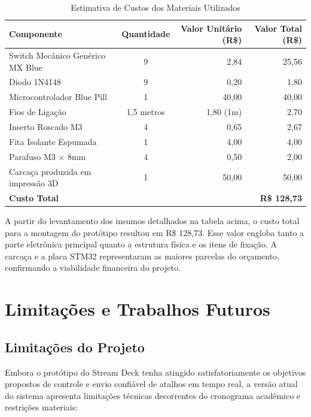 \documentclass[12pt, a4paper]{article}
\begin{document}
\begin{table}[H]
\centering
\caption{Estimativa de Custos dos Materiais Utilizados}
\label{tab:custos}
\begin{tabular}{@{}lcrr@{}}
\toprule
\textbf{Componente} & \textbf{Quantidade} & \textbf{Valor Unitário (R\$)} & \textbf{Valor Total (R\$)} \\ \midrule
Switch Mecânico Genérico MX Blue & 9 & 2,84 & 25,56 \\
Diodo 1N4148 & 9 & 0,20 & 1,80 \\
Microcontrolador Blue Pill & 1 & 40,00 & 40,00 \\
Fios de Ligação & 1,5 metros & 1,80 (1m) & 2,70 \\
Inserto Roscado M3 & 4 & 0,65 & 2,67 \\
Fita Isolante Espumada & 1 & 4,00 & 4,00 \\
Parafuso M3 $\times$ 8mm & 4 & 0,50 & 2,00 \\
Carcaça produzida em impressão 3D & 1 & 50,00 & 50,00 \\ \midrule
\textbf{Custo Total} & & & \textbf{R\$ 128,73} \\ \bottomrule
\end{tabular}
\end{table}

A partir do levantamento dos insumos detalhados na tabela acima, o custo total para a montagem do protótipo resultou em R\$ 128,73. Esse valor engloba tanto a parte eletrônica principal quanto a estrutura física e os itens de fixação. A carcaça e a placa STM32 representaram as maiores parcelas do orçamento, confirmando a viabilidade financeira do projeto.

\section{Limitações e Trabalhos Futuros}

\subsection{Limitações do Projeto}
\hspace*{1.25cm}Embora o protótipo do Stream Deck tenha atingido satisfatoriamente os objetivos propostos de controle e envio confiável de atalhos em tempo real, a versão atual do sistema apresenta limitações técnicas decorrentes do cronograma acadêmico e restrições materiais:
\end{document}
